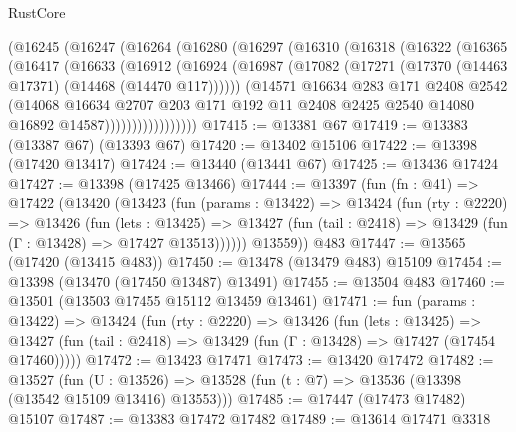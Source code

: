 \begin{lexlean}{RustCore}
\begin{coremodule}
        (@16245
          (@16247
            (@16264
              (@16280
                (@16297
                  (@16310
                    (@16318
                      (@16322
                        (@16365
                          (@16417
                            (@16633
                              (@16912
                                (@16924
                                  (@16987
                                    (@17082
                                      (@17271 (@17370 (@14463 @17371) (@14468 (@14470 @117))))))
                                  (@14571
                                    @16634
                                    @283
                                    @171
                                    @2408
                                    @2542
                                    (@14068
                                      @16634
                                      @2707
                                      @203
                                      @171
                                      @192
                                      @11
                                      @2408
                                      @2425
                                      @2540
                                      @14080
                                      @16892
                                      @14587)))))))))))))))))
@17415 := @13381 @67
@17419 := @13383 (@13387 @67) (@13393 @67)
@17420 := @13402 @15106
@17422 := @13398 (@17420 @13417)
@17424 := @13440 (@13441 @67)
@17425 := @13436 @17424
@17427 := @13398 (@17425 @13466)
@17444 := @13397
    (fun (fn : @41) =>
    @17422
      (@13420
        (@13423
          (fun (params : @13422) =>
          @13424
            (fun (rty : @2220) =>
            @13426
              (fun (lets : @13425) =>
              @13427 (fun (tail : @2418) => @13429 (fun (Γ : @13428) => @17427 @13513))))))
        @13559))
    @483
@17447 := @13565 (@17420 (@13415 @483))
@17450 := @13478 (@13479 @483) @15109
@17454 := @13398 (@13470 (@17450 @13487) @13491)
@17455 := @13504 @483
@17460 := @13501 (@13503 @17455 @15112 @13459 @13461)
@17471 := fun (params : @13422) =>
  @13424
    (fun (rty : @2220) =>
    @13426
      (fun (lets : @13425) =>
      @13427 (fun (tail : @2418) => @13429 (fun (Γ : @13428) => @17427 (@17454 @17460)))))
@17472 := @13423 @17471
@17473 := @13420 @17472
@17482 := @13527
    (fun (U : @13526) => @13528 (fun (t : @7) => @13536 (@13398 (@13542 @15109 @13416) @13553)))
@17485 := @17447 (@17473 @17482) @15107
@17487 := @13383 @17472 @17482
@17489 := @13614 @17471 @3318

\end{coremodule}
\end{lexlean}
